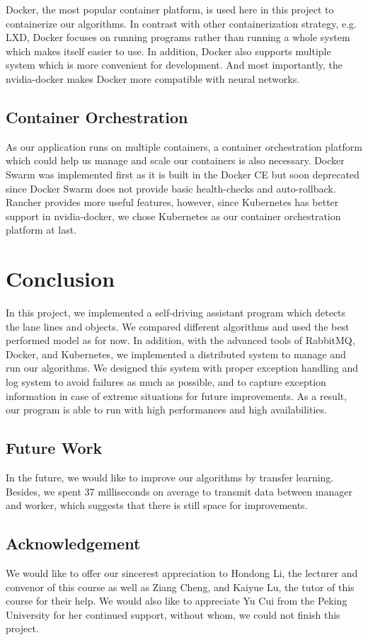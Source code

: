 \documentclass[runningheads]{llncs}
\begin{document}
Docker, the most popular container platform, is used here 
in this project to containerize our algorithms. In contrast 
with other containerization strategy, e.g. LXD, Docker 
focuses on running programs rather than running a whole 
system which makes itself easier to use. In addition, 
Docker also supports multiple system which is more 
convenient for development. And most importantly, the 
nvidia-docker makes Docker more compatible with neural 
networks.

\subsection{Container Orchestration}
As our application runs on multiple containers, a container 
orchestration platform which could help us manage and scale 
our containers is also necessary. Docker Swarm was 
implemented first as it is built in the Docker CE but soon 
deprecated since Docker Swarm does not provide basic 
health-checks and auto-rollback. Rancher provides more 
useful features, however, since Kubernetes has better 
support in nvidia-docker, we chose Kubernetes as our 
container orchestration platform at last.


\section{Conclusion}
In this project, we implemented a self-driving assistant 
program which detects the lane lines and objects. We 
compared different algorithms and used the best performed 
model as for now. In addition, with the advanced tools of 
RabbitMQ, Docker, and Kubernetes, we implemented a 
distributed system to manage and run our algorithms. We 
designed this system with proper exception handling and log 
system to avoid failures as much as possible, and to 
capture exception information in case of extreme situations 
for future improvements. As a result, our program is able 
to run with high performances and high availabilities. 

\subsection{Future Work}
In the future, we would like to improve our algorithms by 
transfer learning. Besides, we spent 37 milliseconds on 
average to transmit data between manager and worker, which 
suggests that there is still space for improvements. 

\subsection{Acknowledgement}
We would like to offer our sincerest appreciation to 
Hondong Li, the lecturer and convenor of this course as 
well as Ziang Cheng, and Kaiyue Lu, the tutor of this 
course for their help. We would also like to appreciate 
Yu Cui from the Peking University for her continued support, 
without whom, we could not finish this project. 
\end{document}

